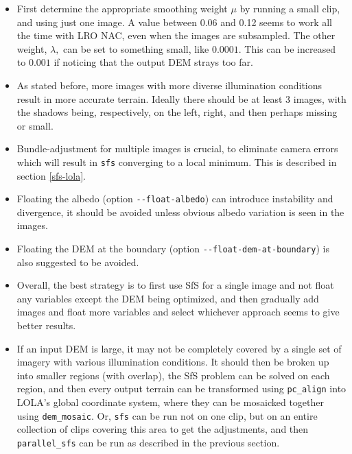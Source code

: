 \begin{itemize}{}

\item First determine the appropriate smoothing weight $\mu$ by running a
  small clip, and using just one image. A value between 0.06 and 0.12 seems to work 
  all the time with LRO NAC, even when the images are subsampled. The other weight, $\lambda,$ can
  be set to something small, like $0.0001.$ This can be increased to $0.001$ if noticing
  that the output DEM strays too far. 

\item As stated before, more images with more diverse illumination conditions
  result in more accurate terrain. Ideally there should be at least 3 images, with the shadows
  being, respectively, on the left, right, and then perhaps missing or small. 

\item Bundle-adjustment for multiple images is crucial, to eliminate
  camera errors which will result in \texttt{sfs} converging to a local
  minimum. This is described in section \ref{sfs-lola}.

\item Floating the albedo (option \texttt{-\/-float-albedo}) can
  introduce instability and divergence, it should be avoided unless
  obvious albedo variation is seen in the images.

\item Floating the DEM at the boundary (option
  \texttt{-\/-float-dem-at-boundary}) is also suggested to be avoided.

\item Overall, the best strategy is to first use SfS for a single image
  and not float any variables except the DEM being optimized, and then
  gradually add images and float more variables and select whichever
  approach seems to give better results.

\item If an input DEM is large, it may not be completely covered by a
  single set of imagery with various illumination conditions.  It should
  then be broken up into smaller regions (with overlap), the SfS problem
  can be solved on each region, and then every output terrain can be
  transformed using \texttt{pc\_align} into LOLA's global coordinate
  system, where they can be mosaicked together using
  \texttt{dem\_mosaic}. Or, \texttt{sfs} can be run not on one clip, but
  on an entire collection of clips covering this area to get the
  adjustments, and then \texttt{parallel\_sfs} can be run as described in
  the previous section. 


\end{itemize}
